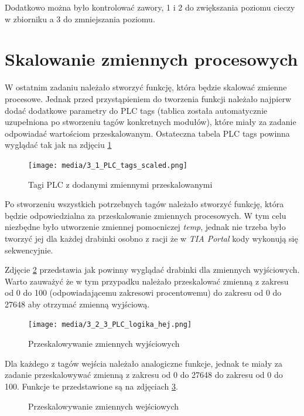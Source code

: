 \documentclass{article}
\begin{document}
Dodatkowo można było kontrolować zawory, 1 i 2 do zwiększania poziomu cieczy w zbiorniku a 3 do zmniejszania poziomu. 

\newpage
\section{Skalowanie zmiennych procesowych}
W ostatnim zadaniu należało stworzyć funkcję, która będzie skalować zmienne procesowe. Jednak przed przystąpieniem do tworzenia funkcji należało najpierw dodać dodatkowe parametry do PLC tags (tablica została automatycznie uzupełniona po stworzeniu tagów konkretnych modułów), które miały za zadanie odpowiadać wartościom przeskalowanym. Ostateczna tabela PLC tags powinna wyglądać tak jak na zdjęciu \ref{fig:zdj10}

\begin{figure}[H]
    \centering
    \texttt{[image: media/3\_1\_PLC\_tags\_scaled.png]}
    \caption{Tagi PLC z dodanymi zmiennymi przeskalowanymi}
    \label{fig:zdj10}
\end{figure}


Po stworzeniu wszystkich potrzebnych tagów należało stworzyć funkcję, która będzie odpowiedzialna za przeskalowanie zmiennych procesowych. W tym celu niezbędne było utworzenie zmiennej pomocniczej \textit{temp}, jednak nie trzeba było tworzyć jej dla każdej drabinki osobno z racji że w \textit{TIA Portal} kody wykonują się sekwencyjnie.

\vspace{1em}
Zdjęcie \ref{fig:zdj13} przedstawia jak powinny wyglądać drabinki dla zmiennych wyjściowych. Warto zauważyć że w tym przypadku należało przeskalować zmienną z zakresu od 0 do 100 (odpowiadającemu zakresowi procentowemu) do zakresu od 0 do 27648 aby otrzymać zmienną wyjściową. 


\begin{figure}[H]
    \centering
    \texttt{[image: media/3\_2\_3\_PLC\_logika\_hej.png]}
    \caption{Przeskalowywanie zmiennych wyjściowych}
    \label{fig:zdj13}
\end{figure}

\newpage
Dla każdego z tagów wejścia należało analogiczne funkcje, jednak te miały za zadanie przeskalowywać zmienną z zakresu od 0 do 27648 do zakresu od 0 do 100. Funkcje te przedstawione są na zdjęciach \ref{fig:main420}.
\begin{figure}[H]
    \centering
    \caption{Przeskalowywanie zmiennych wejściowych}
    \label{fig:main420}
\end{figure}
\end{document}
